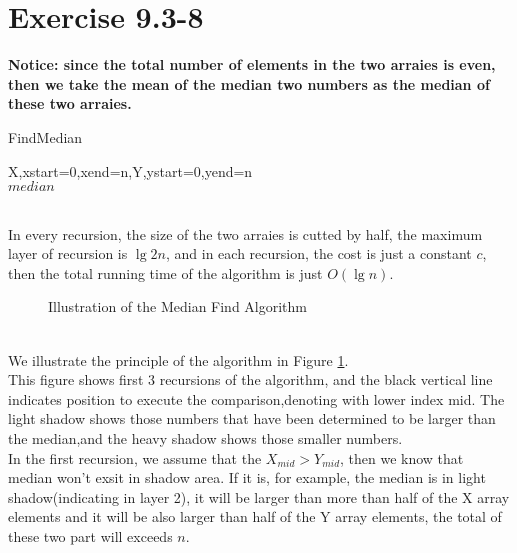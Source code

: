 \documentclass[oneside]{homework} %
\begin{document}
\section*{Exercise 9.3-8}
{\bfseries 
  Notice: since the total number of elements in the two arraies is even, then we take the mean of the median two numbers as the median of these two arraies.
}
  \begin{algorithm}[h]
  \caption{FindMedian}
  \label{algo:lgnmedian}
  \begin{algorithmic}[1]
	\REQUIRE X,xstart=0,xend=n,Y,ystart=0,yend=n
	\ENSURE ~ ~\\ 
	  \ELSE
	  \ENDIF
	\LASTCON $median$	
  \end{algorithmic}
  \end{algorithm}
\\In every recursion, the size of the two arraies is cutted by half, the maximum layer of recursion is $\lg 2n $, and in each recursion, the cost is just a constant $c$, then the total running time of the algorithm is just $O(\lg n)$.
\begin{figure}[!h]
  \centerline{
}
  \caption{Illustration of the Median Find Algorithm}
  \label{fig:illalgomedian}
\end{figure}
\\We illustrate the principle of the algorithm in Figure \ref{fig:illalgomedian}. \\This figure shows first 3 recursions of the algorithm, and the black vertical line indicates position to execute the comparison,denoting with lower index mid. The light shadow shows those numbers that have been determined to be larger than the median,and the heavy shadow shows those smaller numbers.
\\In the first recursion, we assume that the $X_{mid} > Y_{mid}$, then we know that median won't exsit in shadow area. If it is, for example, the median is in light shadow(indicating in layer 2), it will be larger than more than half of the X array elements and it will be also larger than half of the Y array elements, the total of these two part will exceeds $n$. \\
\end{document}
